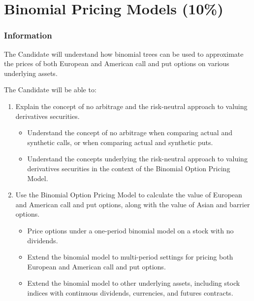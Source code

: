 \chapter[Binomial Pricing Models]{Binomial Pricing Models (10\%)}

\subsection{Information}

\begin{distributions}[Objective]
The Candidate will understand how binomial trees can be used to approximate the prices of both European and American call and put options on various underlying assets.
\end{distributions}

\begin{outcomes}
The Candidate will be able to:
\begin{enumerate}[label = \alph*)]
	\item	Explain the concept of no arbitrage and the risk-neutral approach to valuing derivatives securities.
		\begin{knowledge}[]
		\begin{itemize}
		\item	Understand the concept of no arbitrage when comparing actual and synthetic calls, or when comparing actual and synthetic puts.
		\item	Understand the concepts underlying the risk-neutral approach to valuing derivatives securities in the context of the Binomial Option Pricing Model.
		\end{itemize}
		\end{knowledge}
	\item	Use the Binomial Option Pricing Model to calculate the value of European and American call and put options, along with the value of Asian and barrier options.
		\begin{knowledge}[]
		\begin{itemize}
		\item	Price options under a one-period binomial model on a stock with no dividends.
		\item	Extend the binomial model to multi-period settings for pricing both European and American call and put options.
		\item	Extend the binomial model to other underlying assets, including stock indices with continuous dividends, currencies, and futures contracts.
		\end{itemize}
		\end{knowledge}
	\end{enumerate}
\end{outcomes}


